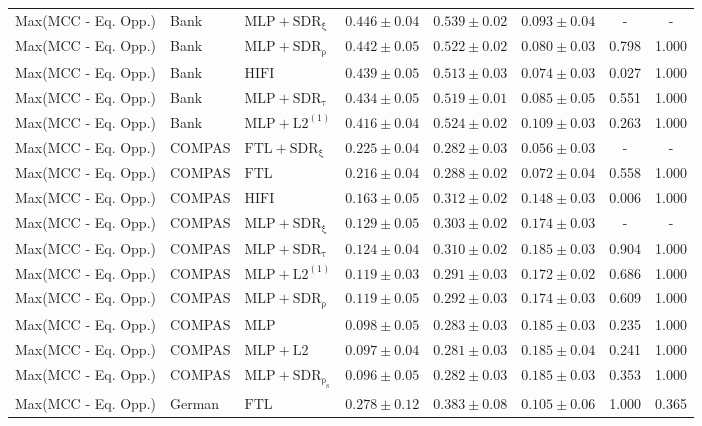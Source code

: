 \begin{table}[htbp]
\begin{tabular}{lllccccc}
Max(MCC - Eq. Opp.) & Bank & $\mathrm{MLP+SDR_{\xi}}$ & $0.446 \pm0.04$ & $0.539 \pm0.02$ & $0.093 \pm0.04$ & - & - \\
Max(MCC - Eq. Opp.) & Bank & $\mathrm{MLP+SDR_{\rho}}$ & $0.442 \pm0.05$ & $0.522 \pm0.02$ & $0.080 \pm0.03$ & 0.798 & 1.000 \\
Max(MCC - Eq. Opp.) & Bank & $\mathrm{HIFI}$ & $0.439 \pm0.05$ & $0.513 \pm0.03$ & $0.074 \pm0.03$ & 0.027 & 1.000 \\
Max(MCC - Eq. Opp.) & Bank & $\mathrm{MLP+SDR_{\tau}}$ & $0.434 \pm0.05$ & $0.519 \pm0.01$ & $0.085 \pm0.05$ & 0.551 & 1.000 \\
Max(MCC - Eq. Opp.) & Bank & $\mathrm{MLP+L2^{(1)}}$ & $0.416 \pm0.04$ & $0.524 \pm0.02$ & $0.109 \pm0.03$ & 0.263 & 1.000 \\
Max(MCC - Eq. Opp.) & COMPAS & $\mathrm{FTL+SDR_{\xi}}$ & $0.225 \pm0.04$ & $0.282 \pm0.03$ & $0.056 \pm0.03$ & - & - \\
Max(MCC - Eq. Opp.) & COMPAS & $\mathrm{FTL}$ & $0.216 \pm0.04$ & $0.288 \pm0.02$ & $0.072 \pm0.04$ & 0.558 & 1.000 \\
Max(MCC - Eq. Opp.) & COMPAS & $\mathrm{HIFI}$ & $0.163 \pm0.05$ & $0.312 \pm0.02$ & $0.148 \pm0.03$ & 0.006 & 1.000 \\
Max(MCC - Eq. Opp.) & COMPAS & $\mathrm{MLP+SDR_{\xi}}$ & $0.129 \pm0.05$ & $0.303 \pm0.02$ & $0.174 \pm0.03$ & - & - \\
Max(MCC - Eq. Opp.) & COMPAS & $\mathrm{MLP+SDR_{\tau}}$ & $0.124 \pm0.04$ & $0.310 \pm0.02$ & $0.185 \pm0.03$ & 0.904 & 1.000 \\
Max(MCC - Eq. Opp.) & COMPAS & $\mathrm{MLP+L2^{(1)}}$ & $0.119 \pm0.03$ & $0.291 \pm0.03$ & $0.172 \pm0.02$ & 0.686 & 1.000 \\
Max(MCC - Eq. Opp.) & COMPAS & $\mathrm{MLP+SDR_{\rho}}$ & $0.119 \pm0.05$ & $0.292 \pm0.03$ & $0.174 \pm0.03$ & 0.609 & 1.000 \\
Max(MCC - Eq. Opp.) & COMPAS & $\mathrm{MLP}$ & $0.098 \pm0.05$ & $0.283 \pm0.03$ & $0.185 \pm0.03$ & 0.235 & 1.000 \\
Max(MCC - Eq. Opp.) & COMPAS & $\mathrm{MLP+L2}$ & $0.097 \pm0.04$ & $0.281 \pm0.03$ & $0.185 \pm0.04$ & 0.241 & 1.000 \\
Max(MCC - Eq. Opp.) & COMPAS & $\mathrm{MLP+SDR_{\rho_s}}$ & $0.096 \pm0.05$ & $0.282 \pm0.03$ & $0.185 \pm0.03$ & 0.353 & 1.000 \\
Max(MCC - Eq. Opp.) & German & $\mathrm{FTL}$ & $0.278 \pm0.12$ & $0.383 \pm0.08$ & $0.105 \pm0.06$ & 1.000 & 0.365 \\

\end{tabular}
\end{table}
